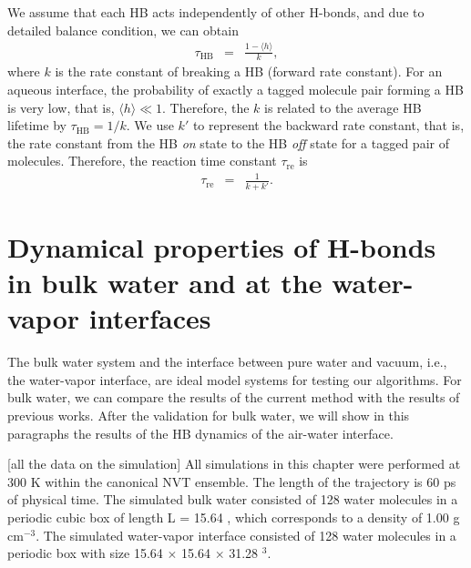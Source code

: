 We assume that each HB acts independently of other H-bonds, \cite{AL96,AL00} 
and due to detailed balance condition, we can obtain 
\begin{eqnarray}
  \tau_{\text{HB}} &=& \frac{1- \langle h\rangle}{k},
\label{eq:rate}
\end{eqnarray}
where $k$ is the rate constant of breaking a HB (forward rate constant). \cite{Chandler1986,Chandler1978} 
For an aqueous interface, the probability of exactly a tagged molecule pair forming a HB is very low, that is, $\langle h\rangle \ll 1$. Therefore,
the $k$ is related to the average HB lifetime by $\tau_{\text{HB}}=1/k$.
We use $k'$ to represent the backward rate constant, that is, the rate constant from the HB \emph{on} state to the HB \emph{off} state for a tagged pair of molecules.
Therefore, the reaction time constant $\tau_\text{re}$ is 
\begin{eqnarray}
  \tau_\text{re} &=& \frac{1}{k+k'}.
\label{eq:reaction_rate_tau}
\end{eqnarray}

%
\FloatBarrier
\section{Dynamical properties of H-bonds in bulk water and at the water-vapor interfaces}
The bulk water system and the interface between pure water and vacuum, i.e., the water-vapor interface, 
are ideal model systems for testing our algorithms.
For bulk water, we can compare the results of the current method with the results of 
previous works.\cite{AL96,Kessler2015} After the validation for bulk water, we will show in this paragraphs the results of the HB dynamics of the air-water interface.

[all the data on the simulation]
All simulations in this chapter were performed at 300 K within the canonical NVT ensemble.
The length of the trajectory is 60 ps of physical time.
The simulated bulk water consisted of 128 water molecules in a periodic cubic box of length L = 15.64 \A, which corresponds to a density of 1.00 g cm$^{-3}$.
The simulated water-vapor interface consisted of 128 water molecules in a periodic box with size 15.64 $\times$ 15.64 $\times$ 31.28 \A$^3$.

